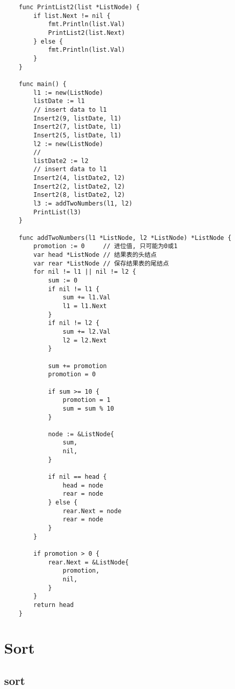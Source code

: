 \documentclass[oneside,12pt,twiside,a4paper]{ctexbook}
\begin{document}
\begin{lstlisting}
    func PrintList2(list *ListNode) {
        if list.Next != nil {
            fmt.Println(list.Val)
            PrintList2(list.Next)
        } else {
            fmt.Println(list.Val)
        }
    }
    
    func main() {
        l1 := new(ListNode)
        listDate := l1
        // insert data to l1
        Insert2(9, listDate, l1)
        Insert2(7, listDate, l1)
        Insert2(5, listDate, l1)
        l2 := new(ListNode)
        //
        listDate2 := l2
        // insert data to l1
        Insert2(4, listDate2, l2)
        Insert2(2, listDate2, l2)
        Insert2(8, listDate2, l2)
        l3 := addTwoNumbers(l1, l2)
        PrintList(l3)
    }
    
    func addTwoNumbers(l1 *ListNode, l2 *ListNode) *ListNode {
        promotion := 0     // 进位值, 只可能为0或1
        var head *ListNode // 结果表的头结点
        var rear *ListNode // 保存结果表的尾结点
        for nil != l1 || nil != l2 {
            sum := 0
            if nil != l1 {
                sum += l1.Val
                l1 = l1.Next
            }
            if nil != l2 {
                sum += l2.Val
                l2 = l2.Next
            }
    
            sum += promotion
            promotion = 0
    
            if sum >= 10 {
                promotion = 1
                sum = sum % 10
            }
    
            node := &ListNode{
                sum,
                nil,
            }
    
            if nil == head {
                head = node
                rear = node
            } else {
                rear.Next = node
                rear = node
            }
        }
    
        if promotion > 0 {
            rear.Next = &ListNode{
                promotion,
                nil,
            }
        }
        return head
    }    
\end{lstlisting}

\chapter{Sort}
\section{sort}
\end{document}
